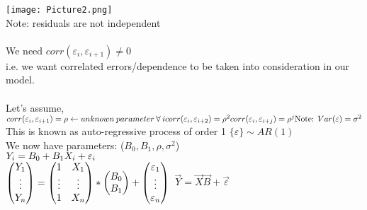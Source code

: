 \documentclass{article}
\begin{document}
\texttt{[image: Picture2.png]} \\
Note: residuals are not independent \\ \\
We need $corr(\varepsilon_{i}, \varepsilon_{i+1}) \ne 0$ \\
i.e. we want correlated errors/dependence to be taken into consideration in 
our model. \\ \\
Let's assume, \\ $corr(\varepsilon_{i}, \varepsilon_{i+1}) = \rho \leftarrow 
unknown \: parameter \: \forall \: i \\
corr(\varepsilon_{i}, \varepsilon_{i+2}) = \rho^{2} \\
corr(\varepsilon_{i}, \varepsilon_{i+j}) = \rho^{j} \\ \\
\text{Note: }Var(\varepsilon) = \sigma^{2}
$ \\
This is known as auto-regressive process of order 1
$\{\varepsilon\} \sim AR(1) $ \\
We now have parameters: (${B}_0, {B}_1, \rho, {\sigma}^2$) \\
$Y_{i} = B_{0} + B_{1}X_{i} + \varepsilon_{i} \\$ \\
$
\left( \begin{matrix} Y_{1} \\ \vdots \\ Y_{n} \end{matrix} \right) 
= \left( \begin{matrix} 1 & X_{1} \\ \vdots & \vdots \\ 1 & X_{n} \end{matrix} 
\right) * \left( \begin{matrix} B_{0} \\ B_{1} \end{matrix} \right)
+ \left( \begin{matrix} \varepsilon_{1} \\ \vdots \\ \varepsilon_{n} 
\end{matrix} \right) \\ \\ \\$ 
$ \vec{Y} = \vec{X}\vec{B} + \vec{\varepsilon}$\\
\end{document}
